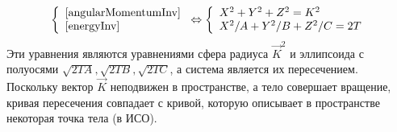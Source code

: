 \documentclass{article}
\begin{document}
\begin{equation}
\left\{
\begin{array}{l}
\ref{angularMomentumInv}\\
\ref{energyInv}
\end{array}
\right.
\Leftrightarrow
\left\{
\begin{array}{l}
X^2+Y^2+Z^2=K^2\\
X^2/A+Y^2/B+Z^2/C=2T
\end{array}
\right.
\end{equation}
Эти уравнения являются уравнениями сфера радиуса \begin{math} \vec{K}^2 \end{math} и эллипсоида с полуосями \begin{math} \sqrt{2TA}, \sqrt{2TB}, \sqrt{2TC} \end{math}, а система является их пересечением. Поскольку вектор \begin{math} \vec{K} \end{math} неподвижен в пространстве, а тело совершает вращение, кривая пересечения совпадает с кривой, которую описывает в пространстве некоторая точка тела (в ИСО).
\end{document}
